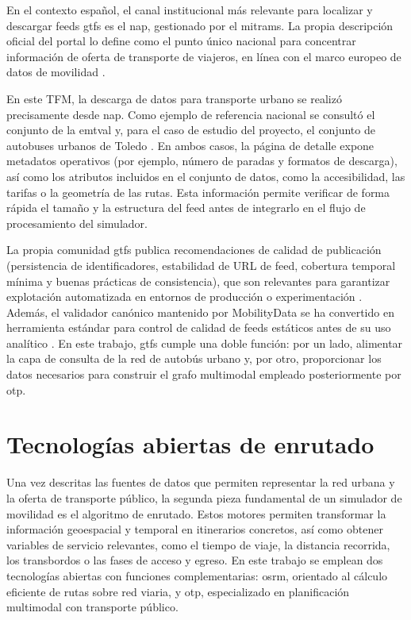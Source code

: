En el contexto español, el canal institucional más relevante para localizar y descargar feeds \gls{gtfs} es el \gls{nap}, gestionado por el \gls{mitrams}. La propia descripción oficial del portal lo define como el punto único nacional para concentrar información de oferta de transporte de viajeros, en línea con el marco europeo de datos de movilidad \cite{NAPHome,NAPQuienesSomos}.

En este TFM, la descarga de datos para transporte urbano se realizó precisamente desde \gls{nap}. Como ejemplo de referencia nacional se consultó el conjunto de la \gls{emtval} y, para el caso de estudio del proyecto, el conjunto de autobuses urbanos de Toledo \cite{NAPEMTValencia,NAPToledoUrbano}. En ambos casos, la página de detalle expone metadatos operativos (por ejemplo, número de paradas y formatos de descarga), así como los atributos incluidos en el conjunto de datos, como la accesibilidad, las tarifas o la geometría de las rutas. Esta información permite verificar de forma rápida el tamaño y la estructura del feed antes de integrarlo en el flujo de procesamiento del simulador.

La propia comunidad \gls{gtfs} publica recomendaciones de calidad de publicación (persistencia de identificadores, estabilidad de URL de feed, cobertura temporal mínima y buenas prácticas de consistencia), que son relevantes para garantizar explotación automatizada en entornos de producción o experimentación \cite{GTFSBestPractices}. Además, el validador canónico mantenido por MobilityData se ha convertido en herramienta estándar para control de calidad de feeds estáticos antes de su uso analítico \cite{GTFSValidator}. En este trabajo, \gls{gtfs} cumple una doble función: por un lado, alimentar la capa de consulta de la red de autobús urbano y, por otro, proporcionar los datos necesarios para construir el grafo multimodal empleado posteriormente por \acrlong{otp}.

\section{Tecnologías abiertas de enrutado}

Una vez descritas las fuentes de datos que permiten representar la red urbana y la oferta de transporte público, la segunda pieza fundamental de un simulador de movilidad es el algoritmo de enrutado. Estos motores permiten transformar la información geoespacial y temporal en itinerarios concretos, así como obtener variables de servicio relevantes, como el tiempo de viaje, la distancia recorrida, los transbordos o las fases de acceso y egreso. En este trabajo se emplean dos tecnologías abiertas con funciones complementarias: \acrshort{osrm}, orientado al cálculo eficiente de rutas sobre red viaria, y \acrlong{otp}, especializado en planificación multimodal con transporte público.


